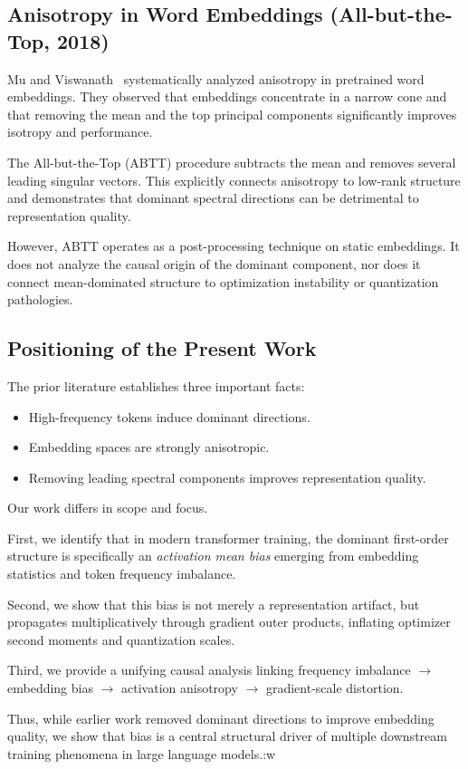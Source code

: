 \subsection{Anisotropy in Word Embeddings (All-but-the-Top, 2018)}

Mu and Viswanath~\cite{mu2018all} systematically analyzed anisotropy
in pretrained word embeddings.
They observed that embeddings concentrate in a narrow cone
and that removing the mean and the top principal components
significantly improves isotropy and performance.

The All-but-the-Top (ABTT) procedure subtracts the mean
and removes several leading singular vectors.
This explicitly connects anisotropy to low-rank structure
and demonstrates that dominant spectral directions
can be detrimental to representation quality.

However, ABTT operates as a post-processing technique
on static embeddings.
It does not analyze the causal origin of the dominant component,
nor does it connect mean-dominated structure to
optimization instability or quantization pathologies.

\subsection{Positioning of the Present Work}

The prior literature establishes three important facts:

\begin{itemize}
\item High-frequency tokens induce dominant directions.
\item Embedding spaces are strongly anisotropic.
\item Removing leading spectral components improves representation quality.
\end{itemize}

Our work differs in scope and focus.

First, we identify that in modern transformer training,
the dominant first-order structure is specifically an
\emph{activation mean bias} emerging from embedding statistics
and token frequency imbalance.

Second, we show that this bias is not merely a representation artifact,
but propagates multiplicatively through gradient outer products,
inflating optimizer second moments and quantization scales.

Third, we provide a unifying causal analysis linking
frequency imbalance $\rightarrow$ embedding bias
$\rightarrow$ activation anisotropy
$\rightarrow$ gradient-scale distortion.

Thus, while earlier work removed dominant directions
to improve embedding quality,
we show that bias is a central structural driver
of multiple downstream training phenomena
in large language models.:w

